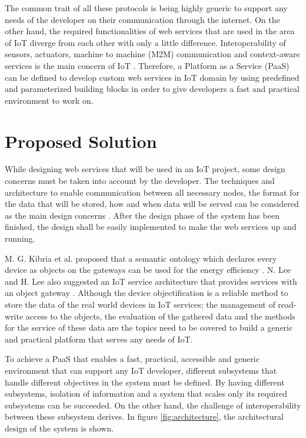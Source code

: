  The common trait of all these protocols is being highly generic to support any needs of the developer on their communication through the internet. On the other hand, the required functionalities of web services that are used in the area of IoT diverge from each other with only a little difference. Interoperability of sensors, actuators, machine to machine (M2M) communication and context-aware services is the main concern of IoT \cite{6651222}. Therefore, a Platform as a Service (PaaS) can be defined to develop custom web services in IoT domain by using predefined and parameterized building blocks in order to give developers a fast and practical environment to work on.

\section{Proposed Solution}



While designing web services that will be used in an IoT project, some design concerns must be taken into account by the developer. The techniques and architecture to enable communication between all necessary nodes, the format for the data that will be stored, how and when data will be served can be considered as the main design concerns \cite{6651222}. After the design phase of the system has been finished, the design shall be easily implemented to make the web services up and running. 

M. G. Kibria et al. proposed that a semantic ontology which declares every device as objects on the gateways can be used for the energy efficiency \cite{7993747}. N. Lee and H. Lee also suggested an IoT service architecture that provides services with an object gateway \cite{6884496}. Although the device objectification is a reliable method to store the data of the real world devices in IoT services; the management of read-write access to the objects, the evaluation of the gathered data and the methods for the service of these data are the topics need to be covered to build a generic and practical platform that serves any needs of IoT. 


To achieve a PaaS that enables a fast, practical, accessible and generic environment that can support any IoT developer, different subsystems that handle different objectives in the system must be defined. By having different subsystems,  isolation of information and a system that scales only its required subsystems can be succeeded. On the other hand, the challenge of interoperability between these subsystem derives. In figure \ref{fig:architecture}, the architectural design of the system is shown.

